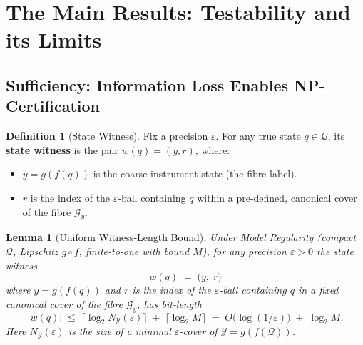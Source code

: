 \documentclass[12pt]{article}
\theoremstyle{definition}
\newtheorem{definition}{Definition}[section]
\theoremstyle{plain}
\newtheorem{lemma}{Lemma}[section]
\begin{document}
\section{The Main Results: Testability and its Limits}\label{sec:main_results}

\subsection{Sufficiency: Information Loss Enables NP-Certification}

\begin{definition}[State Witness]
Fix a precision $\varepsilon$. For any true state $q \in \mathcal{Q}$, its \textbf{state witness} is the pair $w(q) = (y, r)$, where:
\begin{itemize}
    \item $y = g(f(q))$ is the coarse instrument state (the fibre label).
    \item $r$ is the index of the $\varepsilon$-ball containing $q$ within a pre-defined, canonical cover of the fibre $\mathcal{G}_y$.
\end{itemize}
\end{definition}

\begin{lemma}[Uniform Witness‐Length Bound]
Under Model Regularity (compact $\mathcal Q$, Lipschitz $g\circ f$, finite‐to‐one with bound $M$), for any precision $\varepsilon>0$ the state witness
\[
w(q)\;=\;\bigl(y,\;r\bigr)
\]
where $y=g(f(q))$ and $r$ is the index of the $\varepsilon$‐ball containing $q$ in a fixed canonical cover of the fibre $\mathcal G_y$, has bit‐length
\[
|w(q)|\;\le\;\bigl\lceil\log_2 N_{\mathcal Y}(\varepsilon)\bigr\rceil\;+\;\lceil\log_2 M\rceil
\;=\;O\bigl(\log(1/\varepsilon)\bigr)\;+\;\log_2 M.
\]
Here $N_{\mathcal Y}(\varepsilon)$ is the size of a minimal $\varepsilon$‐cover of $\mathcal Y=g(f(\mathcal Q))$.
\end{lemma}
\end{document}
